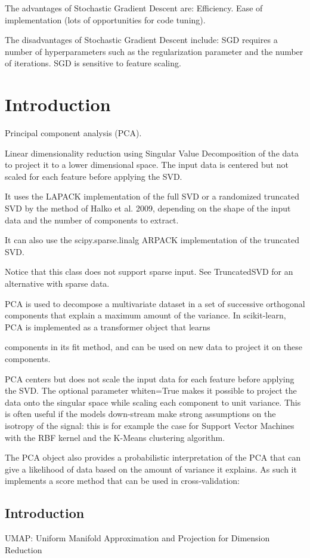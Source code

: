 \documentclass[a4paper,12pt]{article}
\begin{document}
The advantages of Stochastic Gradient Descent are: Efficiency. Ease of implementation (lots of opportunities for code tuning).

The disadvantages of Stochastic Gradient Descent include: SGD requires a number of hyperparameters such as the regularization parameter and the number of iterations. SGD is sensitive to feature scaling.


\section{Introduction}
Principal component analysis (PCA).

Linear dimensionality reduction using Singular Value Decomposition of the data to project it to a lower dimensional space. The input data is centered but not scaled for each feature before applying the SVD.

It uses the LAPACK implementation of the full SVD or a randomized truncated SVD by the method of Halko et al. 2009, depending on the shape of the input data and the number of components to extract.

It can also use the scipy.sparse.linalg ARPACK implementation of the truncated SVD.

Notice that this class does not support sparse input. See TruncatedSVD for an alternative with sparse data.

PCA is used to decompose a multivariate dataset in a set of successive orthogonal components that explain a maximum amount of the variance. In scikit-learn, PCA is implemented as a transformer object that learns

components in its fit method, and can be used on new data to project it on these components.

PCA centers but does not scale the input data for each feature before applying the SVD. The optional parameter whiten=True makes it possible to project the data onto the singular space while scaling each component to unit variance. This is often useful if the models down-stream make strong assumptions on the isotropy of the signal: this is for example the case for Support Vector Machines with the RBF kernel and the K-Means clustering algorithm.

The PCA object also provides a probabilistic interpretation of the PCA that can give a likelihood of data based on the amount of variance it explains. As such it implements a score method that can be used in cross-validation:
\subsection{Introduction}
UMAP: Uniform Manifold
Approximation and Projection for
Dimension Reduction
\end{document}
